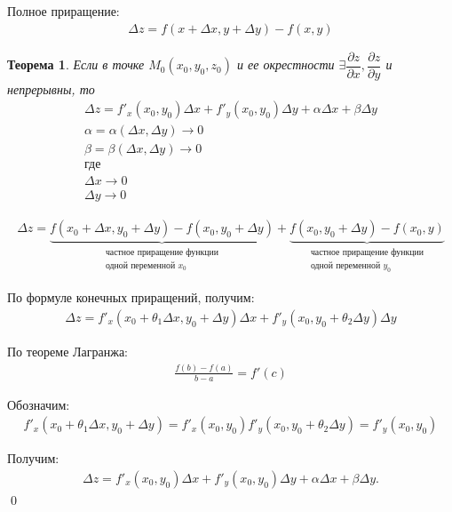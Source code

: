 \documentclass[a4paper,12pt,oneside]{extbook}
\theoremstyle{numbered}
\theoremstyle{unnumbered}
\theoremstyle{named}
\newtheorem{theorem}{Теорема}[section]
\theoremstyle{unnumbered}
\theoremstyle{named}
\theoremstyle{named}
\theoremstyle{named}
\renewenvironment{proof}{{\noindent\textbf{Доказательство.}}}{\qed}
\begin{document}
Полное приращение:
\begin{gather*}
    \Delta z = f(x + \Delta x, y + \Delta y) - f(x, y)
\end{gather*}

\begin{theorem}
    Если в точке \(M_0(x_0, y_0, z_0)\) и ее окрестности \(\exists \dfrac{\partial z}{\partial x}, \dfrac{\partial z}{\partial y}\) и непрерывны, то
    \begin{gather*}
        \Delta z = f'_x(x_0, y_0) \Delta x + f'_y(x_0, y_0) \Delta y + \alpha \Delta x + \beta \Delta y \\
        \alpha = \alpha(\Delta x, \Delta y) \to 0 \\
        \beta = \beta(\Delta x, \Delta y) \to 0 \\
        \text{где} \\
        \Delta x \to 0 \\
        \Delta y \to 0
    \end{gather*}
\end{theorem}

\begin{proof}
    \begin{gather*}
        \Delta z =
        \underbrace{f(x_0 + \Delta x, y_0 + \Delta y) - f(x_0, y_0 + \Delta y)}_{\substack{\text{частное приращение функции} \\ \text{одной переменной \(x_0\)}}}
        +
        \underbrace{f(x_0, y_0 + \Delta y) - f(x_0, y)}_{\substack{\text{частное приращение функции} \\ \text{одной переменной \(y_0\)}}}
    \end{gather*}

    По формуле конечных приращений, получим:
    \begin{gather*}
        \Delta z = f'_x(x_0 + \theta_1 \Delta x, y_0 + \Delta y) \Delta x + f'_y(x_0, y_0 + \theta_2 \Delta y) \Delta y
    \end{gather*}

    По теореме Лагранжа:
    \begin{gather*}
        \frac{f(b) - f(a)}{b - a} = f'(c)
    \end{gather*}

    Обозначим:
    \begin{gather*}
        f'_x(x_0 + \theta_1 \Delta x, y_0 + \Delta y) = f'_x(x_0, y_0)
        f'_y(x_0, y_0 + \theta_2 \Delta y) = f'_y(x_0, y_0)
    \end{gather*}

    Получим:
    \begin{gather*}
        \Delta z = f'_x(x_0, y_0) \Delta x + f'_y(x_0, y_0) \Delta y + \alpha \Delta x + \beta \Delta y.
    \end{gather*}
\end{proof}
\end{document}
